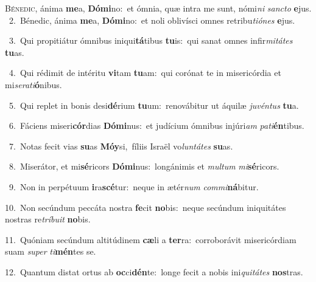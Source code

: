 \lettrine{\initial\textcolor{\initialcolor}{B}}{énedic,} ánima \textbf{me}\-a, \textbf{Dó}\-\textbf{mi}no:~\star et ómnia, quæ intra me sunt, nómi\textit{ni} \textit{sanc}\-\textit{to} \textbf{e}\-jus.\\
{\numbfont\textcolor{\numbcolor}{~2.}}~Bénedic, ánima \textbf{me}\-a, \textbf{Dó}\-\textbf{mi}no:~\star et noli oblivísci omnes retribu\-\textit{ti}\-\textit{ó}\textit{nes} \textbf{e}\-jus.\par
{\numbfont\textcolor{\numbcolor}{~3.}}~Qui propitiátur ómnibus iniqui\-\textbf{tá}\-tibus \textbf{tu}\-is:~\star qui sanat omnes infir\-\textit{mi}\-\textit{tá}\textit{tes} \textbf{tu}\-as.\par
{\numbfont\textcolor{\numbcolor}{~4.}}~Qui rédimit de intéritu \textbf{vi}\-tam \textbf{tu}\-am:~\star qui corónat te in misericórdia et mi\-\textit{se}\-\textit{ra}\textit{ti}\textbf{ó}nibus.\par
{\numbfont\textcolor{\numbcolor}{~5.}}~Qui replet in bonis desi\-\textbf{dé}\-rium \textbf{tu}\-um:~\star renovábitur ut áquilæ \textit{ju}\-\textit{vén}\textit{tus} \textbf{tu}\-a.\par
{\numbfont\textcolor{\numbcolor}{~6.}}~Fáciens miseri\-\textbf{cór}\-dias \textbf{Dó}\-\textbf{mi}nus:~\star et judícium ómnibus injúri\textit{am} \textit{pa}\-\textit{ti}\textbf{én}tibus.\par
{\numbfont\textcolor{\numbcolor}{~7.}}~Notas fecit vias \textbf{su}\-as \textbf{Mó}\-\textbf{y}si,~\star fíliis Israël vo\-\textit{lun}\-\textit{tá}\textit{tes} \textbf{su}\-as.\par
{\numbfont\textcolor{\numbcolor}{~8.}}~Miserátor, et mi\-\textbf{sé}\-ricors \textbf{Dó}\-\textbf{mi}nus:~\star longánimis et \textit{mul}\-\textit{tum} \textit{mi}\-\textbf{sé}ricors.\par
{\numbfont\textcolor{\numbcolor}{~9.}}~Non in perpétuum \textbf{i}\-ra\-\textbf{scé}\-tur:~\star neque in ætér\textit{num} \textit{com}\-\textit{mi}\textbf{ná}bitur.\par
{\numbfont\textcolor{\numbcolor}{10.}}~Non secúndum peccáta nostra \textbf{fe}\-cit \textbf{no}\-bis:~\star neque secúndum iniquitátes nostras re\-\textit{trí}\-\textit{bu}\textit{it} \textbf{no}\-bis.\par
{\numbfont\textcolor{\numbcolor}{11.}}~Quóniam secúndum altitúdinem \textbf{cæ}\-li a \textbf{ter}\-ra:~\star corroborávit misericórdiam suam \textit{su}\-\textit{per} \textit{ti}\-\textbf{mén}tes se.\par
{\numbfont\textcolor{\numbcolor}{12.}}~Quantum distat ortus ab \textbf{oc}\-ci\-\textbf{dén}\-te:~\star longe fecit a nobis ini\-\textit{qui}\-\textit{tá}\textit{tes} \textbf{nos}\-tras.\par
